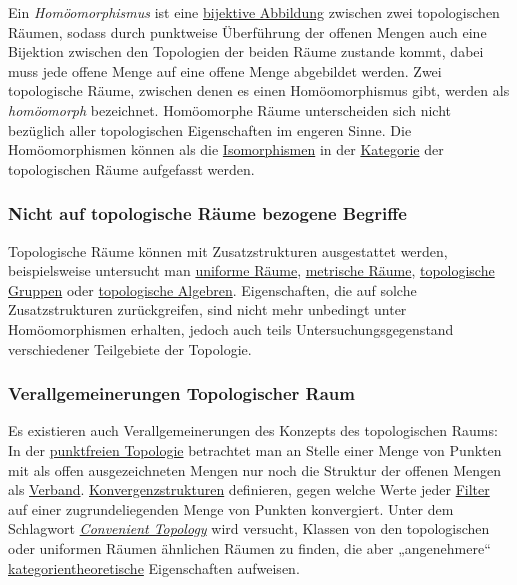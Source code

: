 \documentclass[12pt,]{article}
\begin{document}
 Ein \emph{Homöomorphismus} ist eine \href{Bijektion}{bijektive
Abbildung} zwischen zwei topologischen Räumen, sodass durch punktweise
Überführung der offenen Mengen auch eine Bijektion zwischen den
Topologien der beiden Räume zustande kommt, dabei muss jede offene Menge
auf eine offene Menge abgebildet werden. Zwei topologische Räume,
zwischen denen es einen Homöomorphismus gibt, werden als
\emph{homöomorph} bezeichnet. Homöomorphe Räume unterscheiden sich nicht
bezüglich aller topologischen Eigenschaften im engeren Sinne. Die
Homöomorphismen können als die \href{Isomorphismus}{Isomorphismen} in
der \href{Kategorientheorie}{Kategorie} der topologischen Räume
aufgefasst werden.

\subsubsection{Nicht auf topologische Räume bezogene
Begriffe}\label{nicht-auf-topologische-ruxe4ume-bezogene-begriffe}

Topologische Räume können mit Zusatzstrukturen ausgestattet werden,
beispielsweise untersucht man \href{Uniformer_Raum}{uniforme Räume},
\href{Metrischer_Raum}{metrische Räume},
\href{Topologische_Gruppe}{topologische Gruppen} oder
\href{Topologische_Algebra}{topologische Algebren}. Eigenschaften, die
auf solche Zusatzstrukturen zurückgreifen, sind nicht mehr unbedingt
unter Homöomorphismen erhalten, jedoch auch teils
Untersuchungsgegenstand verschiedener Teilgebiete der Topologie.

\subsubsection{Verallgemeinerungen Topologischer
Raum}\label{verallgemeinerungen-topologischer-raum}

Es existieren auch Verallgemeinerungen des Konzepts des topologischen
Raums: In der \href{Punktfreie_Topologie}{punktfreien Topologie}
betrachtet man an Stelle einer Menge von Punkten mit als offen
ausgezeichneten Mengen nur noch die Struktur der offenen Mengen als
\href{Verband_(Mathematik)}{Verband}.
\href{Konvergenzstruktur}{Konvergenzstrukturen} definieren, gegen welche
Werte jeder \href{Filter_(Mathematik)}{Filter} auf einer
zugrundeliegenden Menge von Punkten konvergiert. Unter dem Schlagwort
\emph{\href{Convenient_Topology}{Convenient Topology}} wird versucht,
Klassen von den topologischen oder uniformen Räumen ähnlichen Räumen zu
finden, die aber „angenehmere``
\href{Kategorientheorie}{kategorientheoretische} Eigenschaften
aufweisen.
\end{document}
